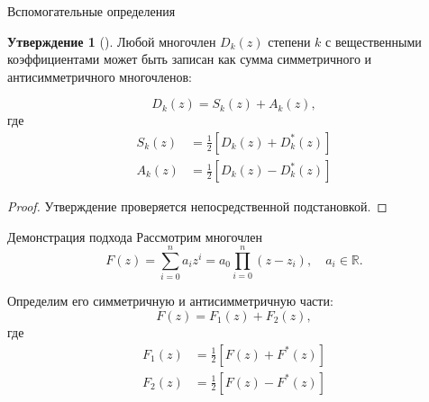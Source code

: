 \documentclass[notheorems,aspectratio=169]{beamer}
\theoremstyle{definition}
\newtheorem{proposition}{Утверждение}
\newcommand{\paren}[1]{\left( #1 \right)}
\begin{document}
\begin{frame}{Вспомогательные определения}
  \begin{proposition}[{\cite{Bistritz1984}}]
    Любой многочлен $D_k(z)$ степени $k$ с вещественными коэффициентами
    может быть записан как сумма симметричного и антисимметричного многочленов:

    \begin{equation*}
      D_k(z) = S_k(z) + A_k(z),
    \end{equation*}
    где
    \begin{equation*}
      \begin{aligned}
        S_k(z) &= \frac{1}{2} \left[ D_k(z) + D_k^*(z) \right] \\
        A_k(z) &= \frac{1}{2} \left[ D_k(z) - D_k^*(z) \right]
      \end{aligned}
    \end{equation*}
  \end{proposition}

  \begin{proof}
    Утверждение проверяется непосредственной подстановкой.
  \end{proof}
\end{frame}

\begin{frame}{Демонстрация подхода}
  Рассмотрим многочлен
  \begin{equation*}
    F(z) = \sum_{i=0}^n a_{i} z^i = a_0 \prod_{i=0}^n \paren{z - z_i}, \quad a_i \in \mathbb{R}.
  \end{equation*}

  Определим его симметричную и антисимметричную части:
  \begin{equation*}
    F(z) = F_1(z) + F_2(z),
  \end{equation*}
  где
  \begin{equation*}
    \begin{aligned}
      F_1(z) &= \frac{1}{2} \left[ F(z) + F^*(z) \right] \\
      F_2(z) &= \frac{1}{2} \left[ F(z) - F^*(z) \right] \\
    \end{aligned}
  \end{equation*}
\end{frame}
\end{document}
